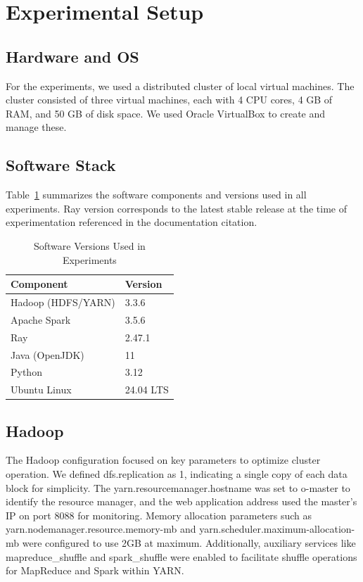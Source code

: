 \documentclass[conference]{IEEEtran}
\begin{document}
\section{Experimental Setup}

\subsection{Hardware and OS}
For the experiments, we used a distributed cluster of local virtual machines.
The cluster consisted of three virtual machines, each with 4 CPU cores,
4 GB of RAM, and 50 GB of disk space. We used Oracle VirtualBox to create and manage these.

\subsection{Software Stack}
Table~\ref{tab:software_versions} summarizes the software components and versions used in all experiments. Ray version corresponds to the latest stable release at the time of experimentation referenced in the documentation citation.
\begin{table}[H]
  \centering
  \caption{Software Versions Used in Experiments}
  \label{tab:software_versions}
  \begin{tabular}{ll}
    \toprule
    \textbf{Component} & \textbf{Version} \\
    \midrule
    Hadoop (HDFS/YARN) & 3.3.6 \\
    Apache Spark & 3.5.6 \\
    Ray & 2.47.1 \\
    Java (OpenJDK) & 11 \\
    Python & 3.12 \\
    Ubuntu Linux & 24.04 LTS \\
    \bottomrule
  \end{tabular}
\end{table}

\subsection{Hadoop}
The Hadoop configuration focused on key parameters to optimize cluster operation.
We defined dfs.replication as 1, indicating a single copy of each data block for simplicity.
The yarn.resourcemanager.hostname was set to o-master to identify the resource manager,
and the web application address used the master's IP on port 8088 for monitoring.
Memory allocation parameters such as yarn.nodemanager.resource.memory-mb and
yarn.scheduler.maximum-allocation-mb were configured to use 2GB at maximum.
Additionally, auxiliary services like mapreduce\_shuffle and
spark\_shuffle were enabled to facilitate shuffle operations for MapReduce and
Spark within YARN.
\end{document}
